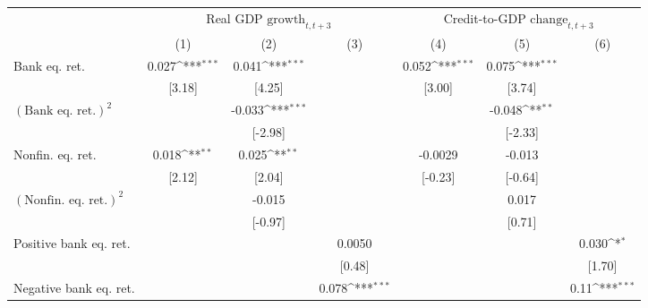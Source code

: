 {
\def\sym#1{\ifmmode^{#1}\else\(^{#1}\)\fi}
\begin{tabular}{l*{6}{c}}
\toprule
                &\multicolumn{3}{c}{Real GDP \(\text{growth}_{t,t+3}\) } &\multicolumn{3}{c}{Credit-to-GDP \(\text{change}_{t,t+3}\) }\\\cmidrule(lr){2-4}\cmidrule(lr){5-7}
                &\multicolumn{1}{c}{(1)}         &\multicolumn{1}{c}{(2)}         &\multicolumn{1}{c}{(3)}         &\multicolumn{1}{c}{(4)}         &\multicolumn{1}{c}{(5)}         &\multicolumn{1}{c}{(6)}         \\
\midrule
Bank eq. ret.   &    0.027\sym{***}&    0.041\sym{***}&                  &    0.052\sym{***}&    0.075\sym{***}&                  \\
                &   [3.18]         &   [4.25]         &                  &   [3.00]         &   [3.74]         &                  \\
\addlinespace
\( (\text{Bank eq. ret.})^2 \)&                  &   -0.033\sym{***}&                  &                  &   -0.048\sym{**} &                  \\
                &                  &  [-2.98]         &                  &                  &  [-2.33]         &                  \\
\addlinespace
Nonfin. eq. ret.&    0.018\sym{**} &    0.025\sym{**} &                  &  -0.0029         &   -0.013         &                  \\
                &   [2.12]         &   [2.04]         &                  &  [-0.23]         &  [-0.64]         &                  \\
\addlinespace
\( (\text{Nonfin. eq. ret.})^2 \)&                  &   -0.015         &                  &                  &    0.017         &                  \\
                &                  &  [-0.97]         &                  &                  &   [0.71]         &                  \\
\addlinespace
Positive bank eq. ret.&                  &                  &   0.0050         &                  &                  &    0.030\sym{*}  \\
                &                  &                  &   [0.48]         &                  &                  &   [1.70]         \\
\addlinespace
Negative bank eq. ret.&                  &                  &    0.078\sym{***}&                  &                  &     0.11\sym{***}\\

\end{tabular}}

